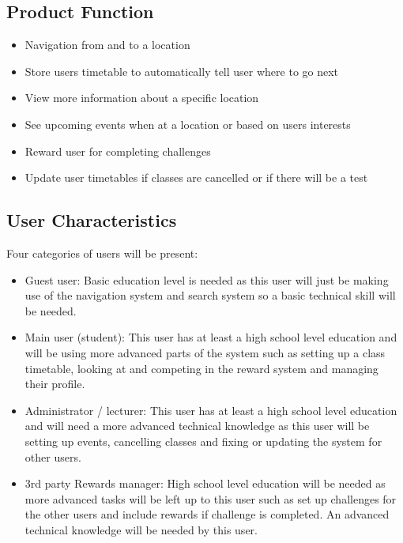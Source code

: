\documentclass{article}
\begin{document}
	\subsection{Product Function}
		\begin{itemize}
 	\item Navigation from and to a location
 	\item Store users timetable to automatically tell user where to go next
	\item View more information about a specific location
 	\item See upcoming events when at a location or based on users interests
 	\item Reward user for completing challenges 
 	\item Update user timetables if classes are cancelled or if there will be a test
 	\end{itemize}
	\subsection{User Characteristics}
	Four categories of users will be present:
 		\begin{itemize}
 
 \item Guest user: Basic education level is needed as this user will just be making use of the navigation system and search system so a basic technical skill will be needed.
 \item Main user (student): This user has at least a high school level education and will be using more advanced parts of the system such as setting up a class timetable, looking at and competing in the reward system and managing their profile.
 \item Administrator / lecturer: This user has at least a high school level education and will need a more advanced technical knowledge as this user will be setting up events, cancelling classes and fixing or updating the system for other users.  
 \item 3rd party Rewards manager: High school level education will be needed as more advanced tasks will be left up to this user such as set up challenges for the other users and include rewards if challenge is completed. An advanced technical knowledge will be needed by this user.
 
 	\end{itemize}
\end{document}
